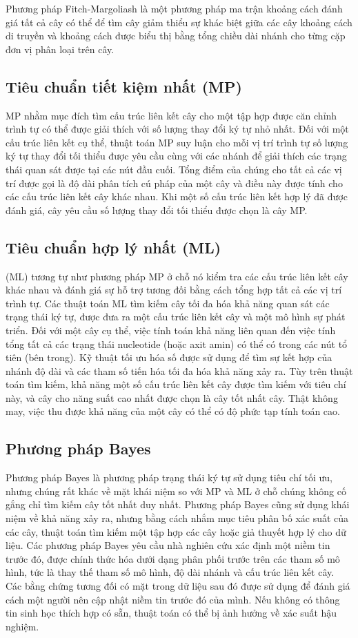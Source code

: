 \documentclass[12pt]{report}
\begin{document}
Phương pháp Fitch-Margoliash \cite{cia-12} là một phương pháp ma trận khoảng cách đánh giá tất cả
cây có thể để tìm cây giảm thiểu sự khác biệt giữa các cây
khoảng cách di truyền và khoảng cách được biểu thị bằng tổng chiều dài nhánh cho
từng cặp đơn vị phân loại trên cây.

\subsection{Tiêu chuẩn tiết kiệm nhất (MP)}
MP nhằm mục đích tìm cấu trúc liên kết cây cho một tập hợp được căn chỉnh trình tự có thể được giải thích với số lượng thay đổi ký tự nhỏ nhất. Đối với một cấu trúc liên kết cụ thể, thuật toán MP suy luận cho mỗi vị trí trình tự số lượng ký tự thay đổi tối thiểu được yêu cầu cùng với các nhánh để giải thích các trạng thái quan sát được tại các nút đầu cuối. Tổng điểm của chúng cho tất cả các vị trí được gọi là độ dài phân tích cú pháp của một cây và điều này được tính cho các cấu trúc liên kết cây khác nhau. Khi một số cấu trúc liên kết hợp lý đã được đánh giá, cây yêu cầu số lượng thay đổi tối thiểu được chọn là cây MP. 

\subsection{Tiêu chuẩn hợp lý nhất (ML)}
(ML) tương tự như phương pháp MP ở chỗ nó kiểm tra
các cấu trúc liên kết cây khác nhau và đánh giá sự hỗ trợ tương đối bằng cách tổng hợp tất cả các vị trí trình tự. Các thuật toán ML tìm kiếm cây tối đa hóa khả năng quan sát các trạng thái ký tự, được đưa ra một cấu trúc liên kết cây và một mô hình sự phát triển. Đối với một cây cụ thể, việc tính toán khả năng liên quan đến việc tính tổng tất cả các trạng thái nucleotide (hoặc axit amin) có thể có trong các nút tổ tiên (bên trong). Kỹ thuật tối ưu hóa số được sử dụng để tìm sự kết hợp của nhánh độ dài và các tham số tiến hóa tối đa hóa khả năng xảy ra. Tùy trên thuật toán tìm kiếm, khả năng một số cấu trúc liên kết cây được tìm kiếm với tiêu chí này, và cây cho năng suất cao nhất được chọn là cây tốt nhất cây. Thật không may, việc thu được khả năng của một cây có thể có độ phức tạp tính toán cao.

\subsection{Phương pháp Bayes}
Phương pháp Bayes là phương pháp trạng thái ký tự sử dụng tiêu chí tối ưu, nhưng chúng rất khác về mặt khái niệm so với MP và ML ở chỗ chúng không cố gắng chỉ tìm kiếm cây tốt nhất duy nhất. Phương pháp Bayes cũng sử dụng khái niệm về khả năng xảy ra, nhưng bằng cách nhắm mục tiêu phân bố xác suất của các cây,
thuật toán tìm kiếm một tập hợp các cây hoặc giả thuyết hợp lý cho dữ liệu. Các phương pháp Bayes yêu cầu nhà nghiên cứu xác định một niềm tin trước đó, được chính thức hóa dưới dạng phân phối trước trên các tham số mô hình, tức là thay thế tham số mô hình, độ dài nhánh và cấu trúc liên kết cây. Các bằng chứng tương đối có mặt trong dữ liệu sau đó được sử dụng để đánh giá cách một người nên cập nhật niềm tin trước đó của mình. Nếu không có thông tin sinh học thích hợp có sẵn, thuật toán có thể bị ảnh hưởng về xác suất hậu nghiệm.
\end{document}
